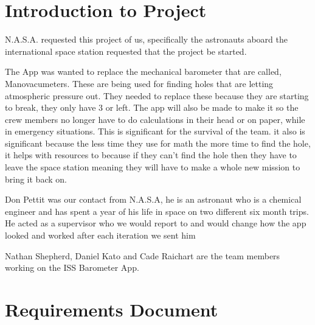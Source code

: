 \documentclass[onecolumn, draftclsnofoot,10pt, compsoc]{IEEEtran}
\begin{document}
\newpage
{}
\tableofcontents
\clearpage


\section{Introduction to Project}

N.A.S.A. requested this project of us, specifically the astronauts aboard the international space station requested that the project be started.

The App was wanted to replace the mechanical barometer that are called, Manovacumeters.
These are being used for finding holes that are letting atmospheric pressure out.
They needed to replace these because they are starting to break, they only have 3 or left.
The app will also be made to make it so the crew members no longer have to do calculations in their head or on paper, while in emergency situations.
This is significant for the survival of the team.
it also is significant because the less time they use for math the more time to find the hole, it helps with resources to because if they can't find the hole then they have to leave the space station meaning they will have to make a whole new mission to bring it back on.

Don Pettit was our contact from N.A.S.A, he is an astronaut who is a chemical engineer and has spent a year of his life in space on two different six month trips.
He acted as a supervisor who we would report to and would change how the app looked and worked after each iteration we sent him

Nathan Shepherd, Daniel Kato and Cade Raichart are the team members working on the ISS Barometer App.

\newpage
\section{Requirements Document}
\end{document}
